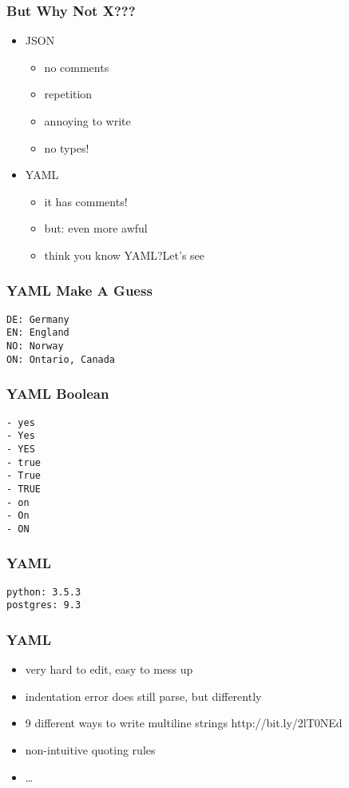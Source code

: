 \documentclass{beamer}
\begin{document}
\begin{frame}
  \frametitle{But Why Not X???}
  \begin{itemize}
  \item JSON
    \begin{itemize}
    \item no comments
    \item repetition
    \item annoying to write
    \item no types!
    \end{itemize}
  \item YAML
    \begin{itemize}
    \item it has comments!
    \item but: even more awful
    \item think you know YAML?\@ Let's see
    \end{itemize}
  \end{itemize}
\end{frame}

\begin{frame}[fragile]
  \frametitle{YAML \textemdash{} Make A Guess}
  \begin{verbatim}
DE: Germany
EN: England
NO: Norway
ON: Ontario, Canada
  \end{verbatim}
\end{frame}

\begin{frame}[fragile]
  \frametitle{YAML \textemdash{} Boolean}
  \begin{verbatim}
- yes
- Yes
- YES
- true
- True
- TRUE
- on
- On
- ON
  \end{verbatim}
\end{frame}

\begin{frame}[fragile]
  \frametitle{YAML}
  \begin{verbatim}
python: 3.5.3
postgres: 9.3
  \end{verbatim}
\end{frame}

\begin{frame}
  \frametitle{YAML}
  \begin{itemize}
  \item very hard to edit, easy to mess up
  \item indentation error does still parse, but differently
  \item 9 different ways to write multiline strings http://bit.ly/2lT0NEd
  \item non-intuitive quoting rules
  \item \ldots{}
  \end{itemize}
\end{frame}
\end{document}
